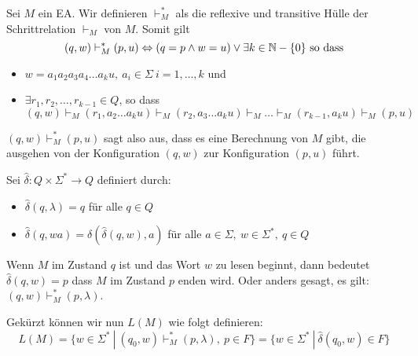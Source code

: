 \begin{definition}
Sei $M$ ein EA. Wir definieren $\vdash_M^*$ als die reflexive und transitive Hülle der Schrittrelation $\vdash_M$ von $M$. Somit gilt
\[
(q, w) \vdash_M^* (p, u) \Leftrightarrow (q = p \land w = u) \lor \exists k \in \mathbb{N} - \{0\} \text{ so dass}
\]
\begin{itemize}
  \item $w = a_1 a_2 a_3 a_4 \ldots a_k u, \ a_i \in \Sigma \ i = 1, \ldots, k$ und
  \item $\exists r_1, r_2, \ldots, r_{k-1} \in Q$, so dass
  $(q, w) \vdash_M (r_1, a_2\ldots a_k u) \vdash_M (r_2, a_3 \ldots a_k u) \vdash_M \ldots \vdash_M (r_{k-1}, a_k u) \vdash_M (p, u)$
\end{itemize}

$(q, w) \vdash_M^* (p, u)$ sagt also aus, dass es eine Berechnung von $M$ gibt, die ausgehen von der Konfiguration $(q, w)$ zur Konfiguration $(p, u)$ führt.\\
\end{definition}

\begin{definition}
Sei $\hat{\delta}: Q \times \Sigma^* \to Q$ definiert durch:
\begin{itemize}
  \item $\hat\delta(q, \lambda) = q$ für alle $q \in Q$
  \item $\hat\delta(q, wa) = \delta(\hat\delta(q, w), a)$ für alle $a \in \Sigma,\ w \in \Sigma^*,\ q \in Q$
\end{itemize}

Wenn $M$ im Zustand $q$ ist und das Wort $w$ zu lesen beginnt, dann bedeutet $\hat\delta(q, w) = p$ dass $M$ im Zustand $p$ enden wird. Oder anders gesagt, es gilt: $(q, w) \vdash_M^* (p, \lambda)$.

Gekürzt können wir nun $L(M)$ wie folgt definieren:
\[
L(M) = \{ w \in \Sigma^* \ |\ (q_0, w) \vdash_M^* (p, \lambda),\ p \in F \} = \{ w \in \Sigma^* \ |\ \hat\delta(q_0, w) \in F \}
\]\\
\end{definition}
